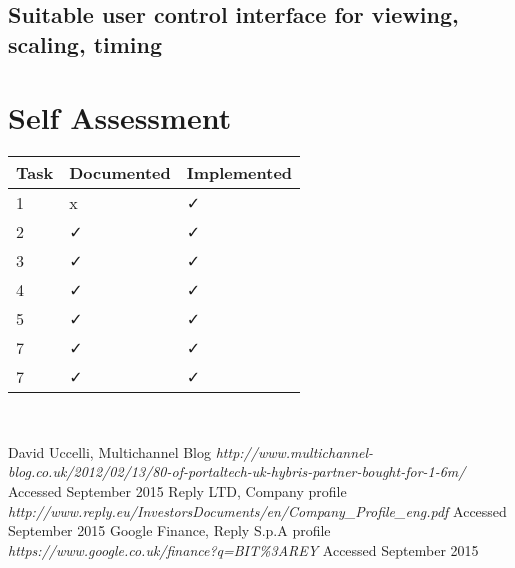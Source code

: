 \documentclass[titlepage]{article}
\begin{document}
\subsection{Suitable user control interface for viewing, scaling, timing}
\section{Self Assessment}

 \begin{tabularx}{0.8\columnwidth}{| X | X | X |}
            \hline
            Task & Documented & Implemented \\
            \hline
            1 & x & ✓ \\
            \hline
            2 & ✓ & ✓ \\
            \hline
            3 & ✓ & ✓ \\
            \hline
            4 & ✓ & ✓ \\
            \hline
            5 & ✓ & ✓ \\
            \hline
            7 & ✓ & ✓ \\
            \hline
            7 & ✓ & ✓ \\
            \hline
        \end{tabularx} \\



 \begin{thebibliography}{1}
 	
 	 David Uccelli, Multichannel Blog {\em http://www.multichannel-blog.co.uk/2012/02/13/80-of-portaltech-uk-hybris-partner-bought-for-1-6m/} Accessed September 2015
 	 Reply LTD, Company profile {\em http://www.reply.eu/InvestorsDocuments/en/Company\_Profile\_eng.pdf} Accessed September 2015
 	 Google Finance, Reply S.p.A profile {\em https://www.google.co.uk/finance?q=BIT\%3AREY} Accessed September 2015
 	
 	
 	
 	
 		

	


 \end{thebibliography}
\end{document}
